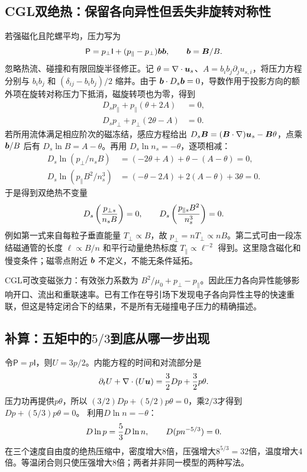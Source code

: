 \documentclass[UTF8,a4paper,11pt,openany,fontset=fandol]{ctexbook}
\begin{document}
\subsection{CGL双绝热：保留各向异性但丢失非旋转对称性}
若强磁化且陀螺平均，压力写为
\begin{equation}\mathsf P=p_\perp\mathsf I+(p_\parallel-p_\perp)\bm{b}\bm{b},\qquad\bm{b}=\bm{B}/B.
\end{equation}
忽略热流、碰撞和有限回旋半径修正。记 $\theta=\nabla\cdot\bm{u}_s$、$A=b_ib_j\partial_ju_{s,i}$，将压力方程分别与 $b_ib_j$ 和 $(\delta_{ij}-b_ib_j)/2$ 缩并。由于 $\bm{b}\cdot D_s\bm{b}=0$，导数作用于投影方向的额外项在旋转对称压力下抵消，磁旋转项也为零，得到
\begin{align}
D_sp_\parallel+p_\parallel(\theta+2A)&=0,\\
D_sp_\perp+p_\perp(2\theta-A)&=0.
\end{align}
若所用流体满足相应阶次的磁冻结，感应方程给出
$D_s\bm{B}=(\bm{B}\cdot\nabla)\bm{u}_s-\bm{B}\theta$，点乘 $\bm{b}/B$ 后有
$D_s\ln B=A-\theta$。再用 $D_s\ln n_s=-\theta$，逐项相减：
\begin{align}
D_s\ln(p_\perp/n_sB)&=(-2\theta+A)+\theta-(A-\theta)=0,\\
D_s\ln(p_\parallel B^2/n_s^3)&=(-\theta-2A)+2(A-\theta)+3\theta=0.
\end{align}
于是得到双绝热不变量
\begin{equation}D_s\left({p_{\perp s}\over n_sB}\right)=0,\qquad
D_s\left({p_{\parallel s}B^2\over n_s^3}\right)=0.\label{eq:cgl}
\end{equation}
例如第一式来自每粒子垂直能量 $T_\perp\propto B$，故 $p_\perp=nT_\perp\propto nB$。第二式可由一段冻结磁通管的长度 $\ell\propto B/n$ 和平行动量绝热标度 $T_\parallel\propto\ell^{-2}$ 得到。这里隐含磁化和慢变条件；磁零点附近 $\bm{b}$ 不定义，不能无条件延拓。

CGL可改变磁张力：有效张力系数为 $B^2/\mu_0+p_\perp-p_\parallel$。因此压力各向异性能够影响开口、流出和重联速率。已有工作在导引场下发现电子各向异性主导的快速重联，但这是特定闭合下的结果，不是所有无碰撞电子压力的精确描述。\citep{Cassak2015}

\subsection{补算：五矩中的$5/3$到底从哪一步出现}
令$\mathsf P=p\mathsf I$，则$U=3p/2$。内能方程的时间和对流部分是
\begin{equation}
 \partial_tU+\nabla\cdot(U\bm{u})
 ={3\over2}Dp+{3\over2}p\theta.
\end{equation}
压力功再提供$p\theta$，所以
$(3/2)Dp+(5/2)p\theta=0$，乘$2/3$才得到
$Dp+(5/3)p\theta=0$。
利用$D\ln n=-\theta$：
\begin{equation}
 D\ln p={5\over3}D\ln n,\qquad D(pn^{-5/3})=0.
\end{equation}
在三个速度自由度的绝热压缩中，密度增大8倍，压强增大$8^{5/3}=32$倍，温度增大4倍。等温闭合则只使压强增大8倍；两者并非同一模型的两种写法。
\end{document}
